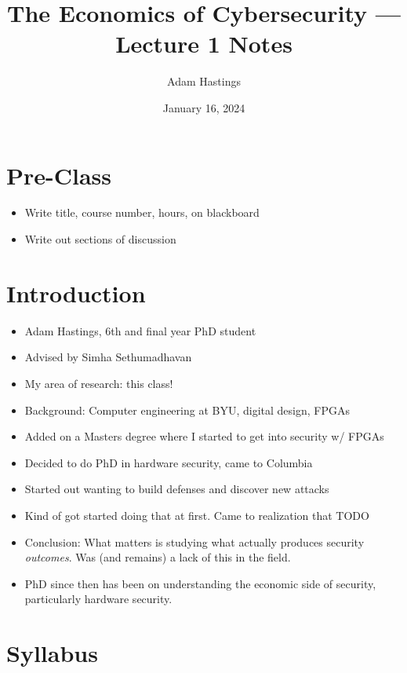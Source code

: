 \documentclass[11pt]{article}
\title{The Economics of Cybersecurity --- Lecture 1 Notes}
\date{January 16, 2024}
\author{Adam Hastings}
\begin{document}
\maketitle

\section*{Pre-Class}
\begin{itemize}
    \item Write title, course number, hours, on blackboard
    \item Write out sections of discussion
\end{itemize}

\section{Introduction}
\begin{itemize}
    \item Adam Hastings, 6th and final year PhD student
    \item Advised by Simha Sethumadhavan
    \item My area of research: this class! 
    \item Background: Computer engineering at BYU, digital design, FPGAs
    \item Added on a Masters degree where I started to get into security w/ FPGAs
    \item Decided to do PhD in hardware security, came to Columbia
    \item Started out wanting to build defenses and discover new attacks 
    \item Kind of got started doing that at first. Came to realization that TODO
    \item Conclusion: What matters is studying what actually produces security {\it outcomes}. Was (and remains) a lack of this in the field.
    \item PhD since then has been on understanding the economic side of security, particularly hardware security.
\end{itemize}


\section{Syllabus}
\end{document}
